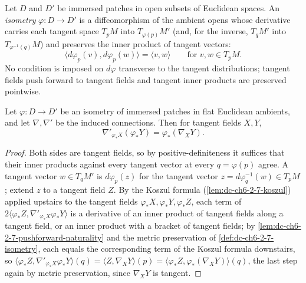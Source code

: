 \begin{definition}
  \label{def:dc-ch6-2-7-isometry}


  Let $D$ and $D'$ be immersed patches in open subsets of Euclidean spaces. An
  \emph{isometry} $\varphi:D\to D'$ is a diffeomorphism of the ambient opens
  whose derivative carries each tangent space $T_pM$ into
  $T_{\varphi(p)}M'$ (and, for the inverse, $T_qM'$ into
  $T_{\varphi^{-1}(q)}M$) and preserves the inner product of tangent vectors:
  $$
  \langle d\varphi_p(v),d\varphi_p(w)\rangle=\langle v,w\rangle
  \qquad\text{for } v,w\in T_pM.
  $$
  No condition is imposed on $d\varphi$ transverse to the tangent distributions;
  tangent fields push forward to tangent fields and tangent inner products are
  preserved pointwise.
\end{definition}

\begin{lemma}
  \label{lem:dc-ch6-2-7-connection}


  Let $\varphi:D\to D'$ be an isometry of immersed patches in flat Euclidean
  ambients, and let $\nabla,\nabla'$ be the induced connections. Then for
  tangent fields $X,Y$,
  $$
  \nabla'_{\varphi_*X}(\varphi_*Y)=\varphi_*(\nabla_XY).
  $$
\end{lemma}
\begin{proof}

  \sketch
  Both sides are tangent fields, so by positive-definiteness it suffices that
  their inner products against every tangent vector at every $q=\varphi(p)$
  agree. A tangent vector $w\in T_qM'$ is $d\varphi_p(z)$ for the tangent
  vector $z=d\varphi^{-1}_q(w)\in T_pM$; extend $z$ to a tangent field $Z$.
  By the Koszul formula (\cref{lem:dc-ch6-2-7-koszul}) applied upstairs to
  the tangent fields $\varphi_*X,\varphi_*Y,\varphi_*Z$, each term of
  $2\langle\varphi_*Z,\nabla'_{\varphi_*X}\varphi_*Y\rangle$ is a
  derivative of an inner product of tangent fields along a tangent field, or
  an inner product with a bracket of tangent fields; by
  \cref{lem:dc-ch6-2-7-pushforward-naturality} and the metric preservation of
  \cref{def:dc-ch6-2-7-isometry}, each equals the corresponding term of the
  Koszul formula downstairs, so
  $\langle\varphi_*Z,\nabla'_{\varphi_*X}\varphi_*Y\rangle(q)
    =\langle Z,\nabla_XY\rangle(p)
    =\langle\varphi_*Z,\varphi_*(\nabla_XY)\rangle(q)$,
  the last step again by metric preservation, since $\nabla_XY$ is tangent.
\end{proof}

